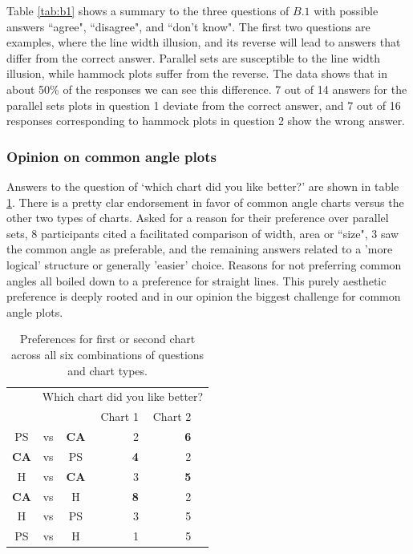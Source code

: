 Table \ref{tab:b1} shows a summary to the  three questions of $B.1$ with possible answers ``agree", ``disagree", and ``don't know".
The first two questions are  examples, where the line width illusion, and its reverse will lead to answers that differ from the correct answer. Parallel sets  are susceptible to the line width illusion, while hammock plots suffer from the reverse. The data shows that in about 50\% of the responses we can see this difference. 7 out of 14 answers for the parallel sets plots in question 1 deviate from the correct answer, and 7 out of 16 responses corresponding to hammock plots in question 2 show the wrong answer.


\subsubsection{Opinion on common angle plots}
Answers to the question of `which chart did you like better?' are shown in table \ref{tab:prefer}. There is a pretty clar endorsement in favor of common angle charts versus the other two types of charts.
Asked for a reason for their preference over parallel sets, 8 participants cited a facilitated comparison of width, area or ``size", 3 saw the common angle as preferable, and the remaining answers related to a 'more logical' structure or generally 'easier' choice.
Reasons for not preferring common angles all boiled down to a preference for straight lines. This purely aesthetic preference is deeply rooted and in our opinion the biggest challenge for common angle plots.
\begin{table}[ht]
\begin{center}
\begin{tabular}{cccrrr}
  \hline
&\multicolumn{5}{r}{Which chart did you like better?}\\
&&& Chart 1 &  Chart 2 \\ 
  \hline
  PS &vs&  {\bf CA} & 2 & \bf 6 \\ 
 {\bf  CA} & vs &  PS & \bf 4 & 2 \\ 
  H & vs &   {\bf  CA} & 3 & \bf 5 \\ 
   {\bf  CA} & vs &  H & \bf 8 & 2 \\ 
  H & vs &  PS & 3 & 5 \\ 
  PS & vs &  H & 1 & 5 \\ 
   \hline
\end{tabular}
\caption{\label{tab:prefer} Preferences for first or second chart across all six combinations of questions and chart types. }
\end{center}
\end{table}

